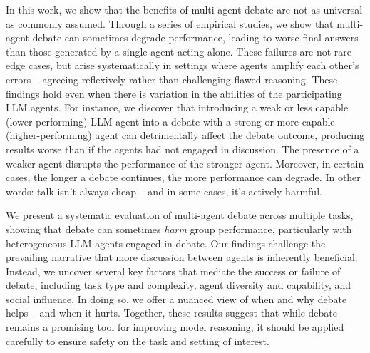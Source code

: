 \documentclass{article}
\begin{document}
In this work, we show that the benefits of multi-agent debate are not as universal as commonly assumed. Through a series of empirical studies, we show that multi-agent debate can sometimes degrade performance, leading to worse final answers than those generated by a single agent acting alone. These failures are not rare edge cases, but arise systematically in settings where agents amplify each other’s errors -- agreeing reflexively rather than challenging flawed reasoning.
These findings hold even when there is variation in the abilities of the participating LLM agents. For instance, we discover that introducing a weak or less capable (lower-performing) LLM agent into a debate with a strong or more capable (higher-performing) agent can detrimentally affect the debate outcome, producing results worse than if the agents had not engaged in discussion. The presence of a weaker agent disrupts the performance of the stronger agent. Moreover, in certain cases, the longer a debate continues, the more performance can degrade.
In other words: talk isn’t always cheap -- and in some cases, it’s actively harmful.

We present a systematic evaluation of multi-agent debate across multiple tasks, showing that debate can sometimes \textit{harm} group performance, particularly with heterogeneous LLM agents engaged in debate.
Our findings challenge the prevailing narrative that more discussion between agents is inherently beneficial. Instead, we uncover several key factors that mediate the success or failure of debate, including task type and complexity, agent diversity and capability, and social influence. In doing so, we offer a nuanced view of when and why debate helps -- and when it hurts.
Together, these results suggest that while debate remains a promising tool for improving model reasoning, it should be applied carefully to ensure safety on the task and setting of interest. 
\end{document}
